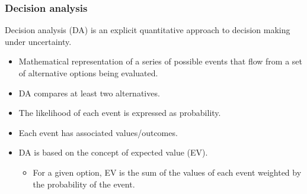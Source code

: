 \begin{frame}
\frametitle{Decision analysis}
Decision analysis (DA) is an \alert{explicit quantitative} approach to decision making \alert{under uncertainty}.
	\begin{itemize}
		\item Mathematical representation of a series of possible events that flow from a set of alternative options being evaluated.
		\item DA compares at least two alternatives.
		\item The likelihood of each event is expressed as probability.
		\item Each event has associated values/outcomes.
		\item DA is based on the concept of \alert{expected value (EV)}.
				\begin{itemize}
		\item For a given option, EV is the sum of the values of each event weighted by the probability of the event.
		\end{itemize}
	\end{itemize}
\end{frame}
